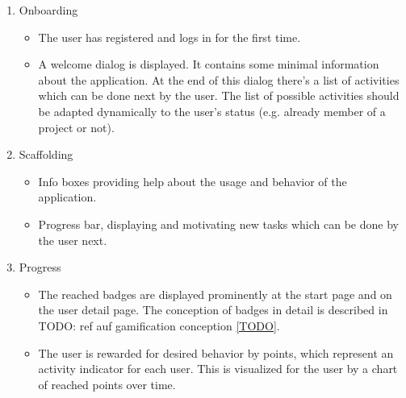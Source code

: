 \begin{enumerate}
	\vspace{-3mm}
	\setlength\itemsep{-1em}
	
	\item Onboarding
	\begin{itemize}
		\vspace{-3mm}
		\setlength\itemsep{-1em}
		
		\item The user has registered and logs in for the first time.
		\item A welcome dialog is displayed. It contains some minimal information about the application. At the end of this dialog there's a list of activities which can be done next by the user. The list of possible activities should be adapted dynamically to the user's status (e.g. already member of a project or not).
	\end{itemize}

	\item Scaffolding
	\begin{itemize}
		\vspace{-3mm}
		\setlength\itemsep{-1em}
		
		\item Info boxes providing help about the usage and behavior of the application.
		\item Progress bar, displaying and motivating new tasks which can be done by the user next.
	\end{itemize}

	\item Progress
	\begin{itemize}
		\vspace{-3mm}
		\setlength\itemsep{-1em}
		
		
		\item The reached badges are displayed prominently at the start page and on the user detail page. The conception of badges in detail is described in TODO: ref auf gamification conception \ref{TODO}.
		\item The user is rewarded for desired behavior by points, which represent an activity indicator for each user. This is visualized for the user by a chart of reached points over time.
	\end{itemize}
\end{enumerate}

